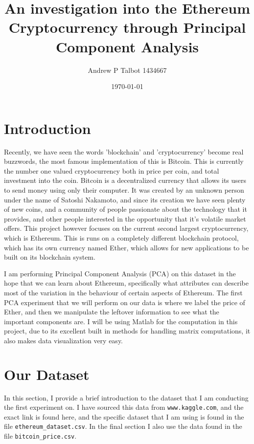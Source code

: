 \documentclass{article}
\begin{document}
\title{An investigation into the Ethereum Cryptocurrency through Principal Component Analysis}
\author{Andrew P Talbot 1434667}
\date{\today}
\maketitle

\vspace{5mm}
\section{Introduction}
Recently, we have seen the words 'blockchain' and 'cryptocurrency' become real buzzwords, the most famous implementation of this is Bitcoin. This is currently the number one valued cryptocurrency both in price per coin, and total investment into the coin. Bitcoin is a decentralized currency that allows its users to send money using only their computer. It was created by an unknown person under the name of Satoshi Nakamoto, and since its creation we have seen plenty of new coins, and a community of people passionate about the technology that it provides, and other people interested in the opportunity that it's volatile market offers. This project however focuses on the current second largest cryptocurrency, which is Ethereum. This is runs on a completely different blockchain protocol, which has its own currency named Ether, which allows for new applications to be built on its blockchain system.
\vspace{3mm}

I am performing Principal Component Analysis (PCA) on this dataset in the hope that we can learn about Ethereum, specifically what attributes can describe most of the variation in the behaviour of certain aspects of Ethereum. The first PCA experiment that we will perform on our data is where we label the price of Ether, and then we manipulate the leftover information to see what the important components are. I will be using Matlab for the computation in this project, due to its excellent built in methods for handling matrix computations, it also makes data visualization very easy.

\section{Our Dataset}

In this section, I provide a brief introduction to the dataset that I am conducting the first experiment on. I have sourced this data from \texttt{www.kaggle.com}, and the exact link is found here\cite{dataset}, and the specific dataset that I am using is found in the file \texttt{ethereum\_dataset.csv}. In the final section I also use the data found in the file \texttt{bitcoin\_price.csv}.
\vspace{3mm}
\end{document}
